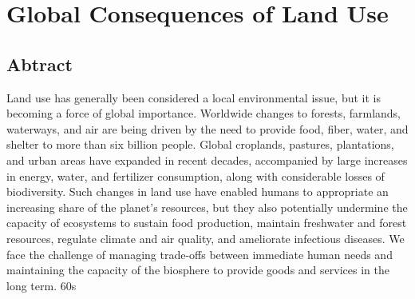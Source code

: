 \section*{Global Consequences of Land Use \citep{Foley2005}}

\subsection*{Abtract}
Land use has generally been considered a local environmental issue, but it is becoming a force of global importance. Worldwide changes to forests, farmlands, waterways, and air are being driven by the need to provide food, fiber, water, and shelter to more than six billion people. Global croplands, pastures, plantations, and urban areas have expanded in recent decades, accompanied by large increases in energy, water, and fertilizer consumption, along with considerable losses of biodiversity. Such changes in land use have enabled humans to appropriate an increasing share of the planet’s resources, but they also potentially undermine the capacity of ecosystems to sustain food production, maintain freshwater and forest resources, regulate climate and air quality, and ameliorate infectious diseases. We face the challenge of managing trade-offs between immediate human needs and maintaining the capacity of the biosphere to provide goods and services in the long term.
60s
